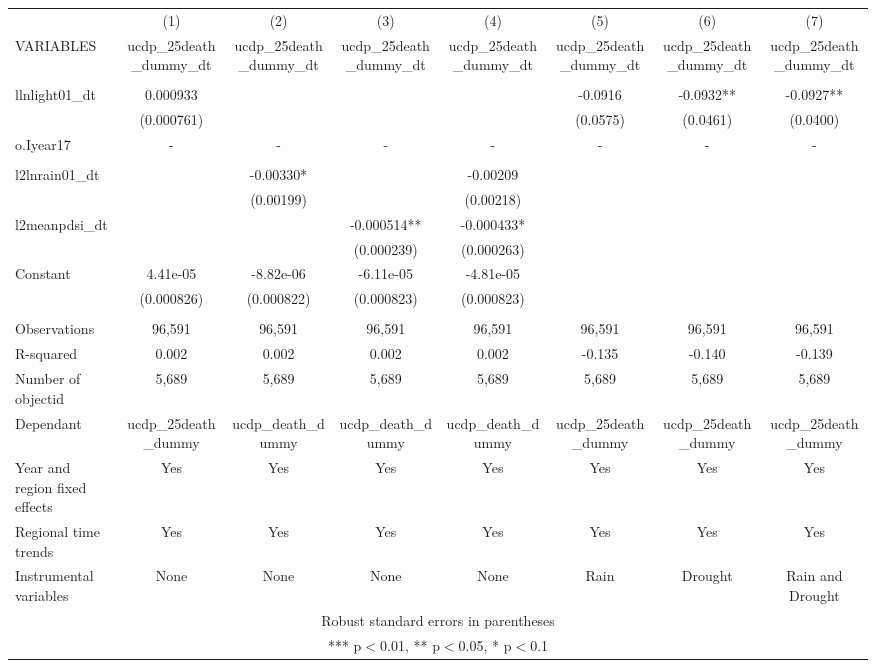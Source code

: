 \documentclass[]{article}
\begin{document}
\begin{tabular}{lccccccc} \hline
 & (1) & (2) & (3) & (4) & (5) & (6) & (7) \\
VARIABLES & ucdp\_25death\_dummy\_dt & ucdp\_25death\_dummy\_dt & ucdp\_25death\_dummy\_dt & ucdp\_25death\_dummy\_dt & ucdp\_25death\_dummy\_dt & ucdp\_25death\_dummy\_dt & ucdp\_25death\_dummy\_dt \\ \hline
 &  &  &  &  &  &  &  \\
llnlight01\_dt & 0.000933 &  &  &  & -0.0916 & -0.0932** & -0.0927** \\
 & (0.000761) &  &  &  & (0.0575) & (0.0461) & (0.0400) \\
o.Iyear17 & - & - & - & - & - & - & - \\
 &  &  &  &  &  &  &  \\
l2lnrain01\_dt &  & -0.00330* &  & -0.00209 &  &  &  \\
 &  & (0.00199) &  & (0.00218) &  &  &  \\
l2meanpdsi\_dt &  &  & -0.000514** & -0.000433* &  &  &  \\
 &  &  & (0.000239) & (0.000263) &  &  &  \\
Constant & 4.41e-05 & -8.82e-06 & -6.11e-05 & -4.81e-05 &  &  &  \\
 & (0.000826) & (0.000822) & (0.000823) & (0.000823) &  &  &  \\
 &  &  &  &  &  &  &  \\
Observations & 96,591 & 96,591 & 96,591 & 96,591 & 96,591 & 96,591 & 96,591 \\
R-squared & 0.002 & 0.002 & 0.002 & 0.002 & -0.135 & -0.140 & -0.139 \\
Number of objectid & 5,689 & 5,689 & 5,689 & 5,689 & 5,689 & 5,689 & 5,689 \\
Dependant & ucdp\_25death\_dummy & ucdp\_death\_dummy & ucdp\_death\_dummy & ucdp\_death\_dummy & ucdp\_25death\_dummy & ucdp\_25death\_dummy & ucdp\_25death\_dummy \\
Year and region fixed effects & Yes & Yes & Yes & Yes & Yes & Yes & Yes \\
Regional time trends & Yes & Yes & Yes & Yes & Yes & Yes & Yes \\
 Instrumental variables & None & None & None & None & Rain & Drought & Rain and Drought \\ \hline
\multicolumn{8}{c}{ Robust standard errors in parentheses} \\
\multicolumn{8}{c}{ *** p$<$0.01, ** p$<$0.05, * p$<$0.1} \\
\end{tabular}
\end{document}

